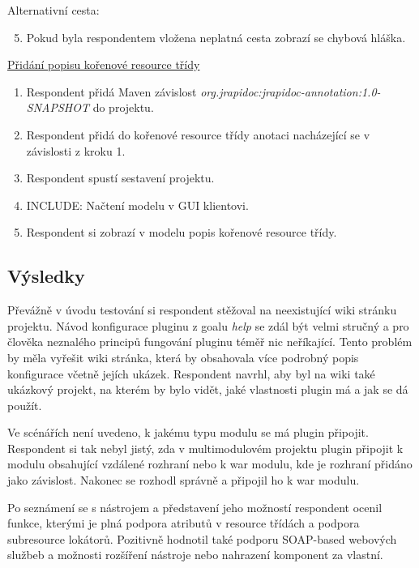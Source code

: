 \documentclass[11pt,twoside,a4paper]{book}
\begin{document}
Alternativní cesta:
\begin{enumerate}
  \setcounter{enumi}{4}
  \item Pokud byla respondentem vložena neplatná cesta zobrazí se chybová hláška.
\end{enumerate}

\underline{Přidání popisu kořenové resource třídy}

\begin{enumerate}
  \item Respondent přidá Maven závislost
  {\em org.jrapidoc:jrapidoc-annotation:1.0-SNAPSHOT} do projektu.
  \item Respondent přidá do kořenové resource třídy anotaci nacházející se v závislosti z
kroku 1.

  \item Respondent spustí sestavení projektu.
  \item INCLUDE: Načtení modelu v GUI klientovi.

  \item Respondent si zobrazí v modelu popis kořenové resource třídy.
\end{enumerate}

\subsection{Výsledky}

Převážně v úvodu testování si respondent stěžoval na neexistující wiki stránku
projektu.
Návod konfigurace pluginu z goalu {\em help} se zdál být velmi stručný a pro
člověka neznalého principů fungování pluginu téměř nic neříkající. Tento problém
by měla vyřešit wiki stránka, která by obsahovala více podrobný popis konfigurace včetně
jejích ukázek. Respondent navrhl, aby byl na wiki také ukázkový projekt, na
kterém by bylo vidět, jaké vlastnosti plugin má a jak se dá použít.

Ve scénářích není uvedeno, k jakému typu modulu se má plugin připojit.
Respondent si tak nebyl jistý, zda v multimodulovém projektu plugin připojit k
modulu obsahující vzdálené rozhraní nebo k war modulu, kde je rozhraní přidáno
jako závislost. Nakonec se rozhodl správně a připojil ho k war modulu.

Po seznámení se s nástrojem a představení jeho možností respondent ocenil
funkce, kterými je plná podpora atributů v resource třídách a podpora
subresource lokátorů. Pozitivně hodnotil také podporu SOAP-based webových
službeb a možnosti rozšíření nástroje nebo nahrazení komponent za vlastní.
\end{document}
